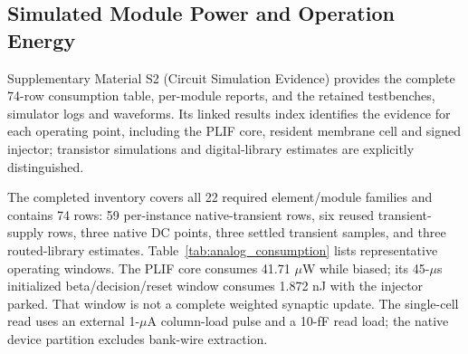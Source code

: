 \documentclass[preprint,12pt,number]{elsarticle}
\begin{document}
\subsection{Simulated Module Power and Operation Energy}
Supplementary Material S2 (Circuit Simulation Evidence) provides the complete 74-row consumption table, per-module reports, and the retained testbenches, simulator logs and waveforms. Its linked results index identifies the evidence for each operating point, including the PLIF core, resident membrane cell and signed injector; transistor simulations and digital-library estimates are explicitly distinguished.

The completed inventory covers all 22 required element/module families and contains 74 rows: 59 per-instance native-transient rows, six reused transient-supply rows, three native DC points, three settled transient samples, and three routed-library estimates. Table~\ref{tab:analog_consumption} lists representative operating windows. The PLIF core consumes 41.71 $\mu$W while biased; its 45-$\mu$s initialized beta/decision/reset window consumes 1.872 nJ with the injector parked. That window is not a complete weighted synaptic update. The single-cell read uses an external 1-$\mu$A column-load pulse and a 10-fF read load; the native device partition excludes bank-wire extraction.
\end{document}
